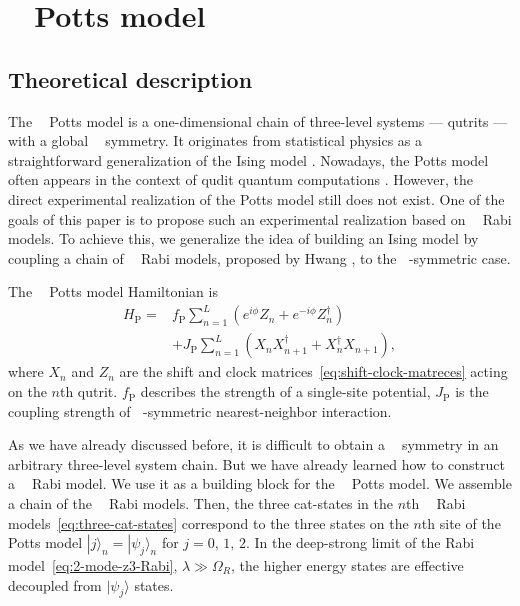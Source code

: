 \documentclass[reprint, aps, prx, amsmath, amssymb, longbibliography, superscriptaddress]{revtex4-2}
\DeclareMathOperator{\Zthree}{\mathbb{Z}_3}
\DeclareMathOperator{\Ztwo}{\mathbb{Z}_2}
\begin{document}
\section{\texorpdfstring{$\Zthree$}{Z3} Potts model}
\label{sec:potts-model}

\subsection{Theoretical description}
\label{sec:theoretical-potts}


The $\Zthree$ Potts model \cite{wu_potts_1982} is a one-dimensional chain of three-level systems --- qutrits --- with a global $\Zthree$ symmetry. It  originates from statistical physics as a straightforward generalization of the Ising model  \cite{wu_potts_1982,baxter_critical_1982}. Nowadays, the Potts model often appears in the context of qudit quantum computations \cite{aharonov_polynomial_2007,okada_efficient_2019}. However, the direct experimental realization of the Potts model still does not exist. One of the goals of this paper is to propose such an experimental realization based on $\Zthree$ Rabi models. To achieve this, we generalize the idea of building an Ising model by coupling a chain of $\Ztwo$ Rabi models, proposed by Hwang \cite{hwang_largescale_2013}, to the $\Zthree$-symmetric case.

The $\Zthree$ Potts model Hamiltonian is
\begin{equation}
\begin{aligned}
\label{eq:potts-hamiltonian}
H_{\text{P}} =& f_{\text{P}} \sum\limits_{n=1}^L \left(e^{i\phi}Z_n + e^{-i\phi}Z_n^{\dagger}\right) \\
  &+  J_{\text{P}} \sum\limits_{n=1}^L \left( X_n X_{n+1}^{\dagger} + X_n^{\dagger} X_{n+1}\right),
\end{aligned}
\end{equation}
where $X_n$ and $Z_n$ are the shift and clock matrices~\eqref{eq:shift-clock-matreces} acting on the $n$th qutrit. $f _\text{P}$ describes the strength of a single-site potential, $J_{\text{P}}$ is the coupling strength of $\Zthree$-symmetric nearest-neighbor interaction.

As we have already discussed before, it is difficult to obtain a $\Zthree$ symmetry in an arbitrary three-level system chain. But we have already learned how to construct a $\Zthree$ Rabi model. We use it as a building block for the $\Zthree$ Potts model. We assemble a chain of the $\Zthree$ Rabi models. Then, the three cat-states in the $n$th $\Zthree$ Rabi models~\eqref{eq:three-cat-states} correspond to the three states on the $n$th site of the Potts model $ |j\rangle_n = |\psi_j\rangle_n $ for $j=0,\, 1,\, 2$. In the deep-strong limit of the Rabi model~\eqref{eq:2-mode-z3-Rabi}, $ \lambda \gg \Omega_R$,  the higher energy states are effective decoupled from $|\psi_j\rangle$ states.
\end{document}
